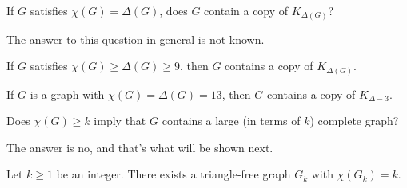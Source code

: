 \begin{question}
    If \(G\) satisfies \(\chi(G) = \Delta(G)\),
    does \(G\) contain a copy of \(K_{\Delta(G)}\)?
\end{question}

The answer to this question in general is not known.

\begin{conjecture}
    If \(G\) satisfies \(\chi(G) \geq \Delta(G) \geq 9\),
    then \(G\) contains a copy of \(K_{\Delta(G)}\).
\end{conjecture}

\begin{theorem}
    If \(G\) is a graph with \(\chi(G) = \Delta(G) = 13\),
    then \(G\) contains a copy of \(K_{\Delta - 3}\).
\end{theorem}

\begin{question}
    Does \(\chi(G) \geq k\) imply that \(G\) contains a large (in terms of \(k\)) complete graph?
\end{question}

The answer is no, and that's what will be shown next.

\begin{theorem}
    Let \(k \geq 1\) be an integer.
    There exists a triangle-free graph \(G_k\) with \(\chi(G_k) = k\).
\end{theorem}


